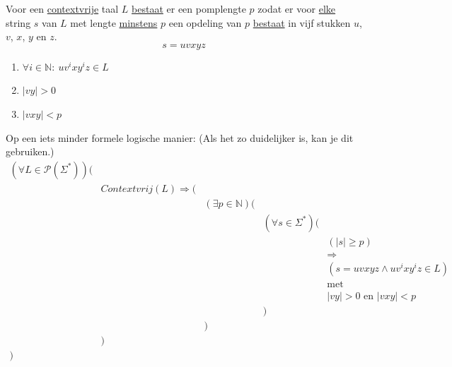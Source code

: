 \documentclass[main.tex]{subfiles}
\begin{document}
\begin{lem}
  Voor een \underline{contextvrije} taal $L$ \underline{bestaat} er een pomplengte $p$  zodat er voor \underline{elke} string $s$ van $L$ met lengte \underline{minstens} $p$ een opdeling van $p$ \underline{bestaat} in vijf stukken $u$, $v$, $x$, $y$ en $z$.
  \[ s = uvxyz \]
  \begin{enumerate}
    \item $\forall i \in \mathbb{N}:\ uv^{i}xy^{i}z \in L$
    \item $|vy| > 0$
    \item $|vxy| < p$
  \end{enumerate}
\end{lem}
Op een iets minder formele logische manier: (Als het zo duidelijker is, kan je dit gebruiken.)
\[
\begin{array}{rrrrl}
  (\forall L\in \mathcal{P}(\Sigma^{*})) (&\\
               & Contextvrij(L) \Rightarrow (&\\
               &                             & (\exists p\in \mathbb{N})(&\\
               &                             &                           &(\forall s \in \Sigma^{*})(&\\
               &                             &                           &                           & (|s| \ge p)\\
               &                             &                           &                           & \Rightarrow\\
               &                             &                           &                           & (s = uvxyz \wedge uv^{i}xy^{i}z \in L)\\
               &                             &                           &                           & \text{met}\\
               &                             &                           &                           & |vy| > 0 \text{ en } |vxy| < p\\
               &                             &                           &                          )&\\
               &                             &                          )&\\
               &                            )&\\
              )&\\ 
\end{array}
\]

\end{document}
